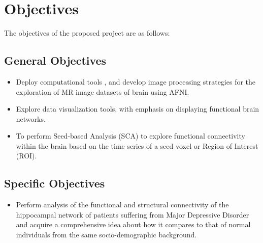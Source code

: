 \documentclass{article}
\begin{document}
\newpage

\section{Objectives}

The objectives of the proposed project are as follows:

\subsection{General Objectives}

\begin{itemize}

  \item Deploy computational tools , and develop image processing
    strategies for the exploration of MR image datasets of brain using
    AFNI.

  \item Explore data visualization tools, with emphasis on displaying
    functional brain networks.

  \item To perform Seed-based Analysis (SCA) to explore functional
    connectivity within the brain based on the time series of a seed
    voxel or Region of Interest (ROI).

\end{itemize}

\subsection{Specific Objectives}

\begin{itemize}

  \item Perform analysis of the functional and structural connectivity
    of the hippocampal network of patients suffering from Major
    Depressive Disorder and acquire a comprehensive idea about how it
    compares to that of normal individuals from the same
    socio-demographic background.



\end{itemize}

\end{document}
